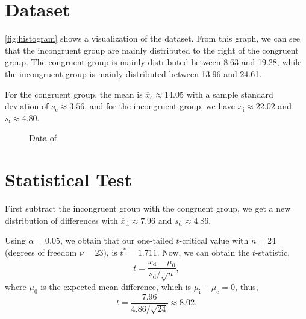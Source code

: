 \documentclass[12pt,titlepage]{article}
\begin{document}
\section{Dataset}
  \autoref{fig:histogram} shows a visualization of the dataset. From this graph, we can see that the incongruent group are mainly distributed to the right of the congruent group. The congruent group is mainly distributed between 8.63 and 19.28, while the incongruent group is mainly distributed between 13.96 and 24.61.
  
  For the congruent group, the mean is $\overline{x}_\mathrm{c} \approx 14.05$ with a sample standard deviation of $s_\mathrm{c} \approx 3.56$, and for the incongruent group, we have $\overline{x}_\mathrm{i} \approx 22.02$ and $s_\mathrm{i} \approx 4.80$.
  
  \begin{figure}[h]
  \centering
    \caption{Data of }
    \label{fig:histogram}
  \end{figure}


\FloatBarrier
\section{Statistical Test}
  First subtract the incongruent group with the congruent group, we get a new distribution of differences with $\overline{x}_\mathrm{d} \approx 7.96$ and $s_\mathrm{d} \approx 4.86$.
  
  Using $\alpha = 0.05$, we obtain that our one-tailed $t$-critical value with $n=24$ (degrees of freedom $\nu = 23$), is $t^*=1.711$. Now, we can obtain the $t$-statistic,
  $$ t = \frac{\overline{x}_\mathrm{d} - \mu_0}{s_\mathrm{d}/\sqrt{n}}, $$
  where $\mu_0$ is the expected mean difference, which is $\mu_\mathrm{i} - \mu_\mathrm{c} = 0$, thus,
  $$ t = \frac{7.96}{4.86 / \sqrt{24}} \approx 8.02. $$
  
\end{document}
